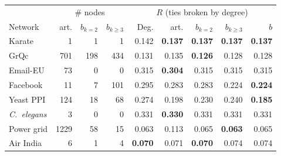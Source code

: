 \setlength{\tabcolsep}{2.8pt}\footnotesize
\begin{tabular}{l rrr | rrrrr}
\toprule
 & \multicolumn{3}{c|}{\# nodes} & \multicolumn{5}{c}{$R$ (ties broken by degree)}\\
Network & art. & $b_{k=2}$ & $b_{k\ge3}$ & Deg. & art. & $b_{k=2}$ & $b_{k\ge3}$ & $b$\\
\midrule
Karate & 1 & 1 & 1 & 0.142 & \textbf{0.137} & \textbf{0.137} & \textbf{0.137} & \textbf{0.137}\\
GrQc & 701 & 198 & 434 & 0.131 & 0.135 & \textbf{0.126} & 0.128 & 0.128\\
Email-EU & 73 & 0 & 0 & 0.315 & \textbf{0.304} & 0.315 & 0.315 & 0.315\\
Facebook & 11 & 7 & 101 & 0.295 & 0.283 & 0.283 & 0.224 & \textbf{0.224}\\
\midrule
Yeast PPI & 124 & 18 & 68 & 0.274 & 0.198 & 0.230 & 0.240 & \textbf{0.185}\\
\emph{C.~elegans} & 3 & 0 & 0 & 0.331 & \textbf{0.330} & 0.331 & 0.331 & 0.331\\
\midrule
Power grid & 1229 & 58 & 15 & 0.063 & 0.113 & 0.065 & \textbf{0.063} & 0.065\\
Air India & 6 & 1 & 4 & \textbf{0.070} & 0.071 & \textbf{0.070} & 0.074 & 0.074\\
\bottomrule
\end{tabular}